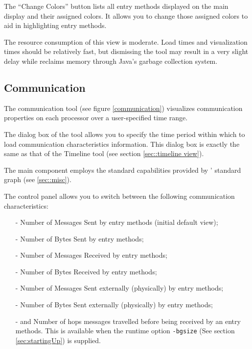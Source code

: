 \documentclass[10pt]{report}
\begin{document}
\begin{itemize}
The ``Change Colors'' button lists all entry methods displayed on the
main display and their assigned colors. It allows you to change those
assigned colors to aid in highlighting entry methods.

The resource consumption of this view is moderate. Load times and
visualization times should be relatively fast, but dismissing the tool
may result in a very slight delay while \projections{} reclaims memory
through Java's garbage collection system.

\end{itemize}

\subsection{Communication}
\label{sec::communication}

The communication tool (see figure \ref{communication}) visualizes
communication properties on each processor over a user-specified time
range.

The dialog box of the tool allows you to specify the time period
within which to load communication characteristics information. This
dialog box is exactly the same as that of the Timeline tool (see
section \ref{sec::timeline view}).

The main component employs the standard capabilities provided by
\projections{}' standard graph (see \ref{sec::misc}).

The control panel allows you to switch between the following
communication characteristics:

\begin{itemize}
\item[-] Number of Messages Sent by entry methods (initial default view);
\item[-] Number of Bytes Sent by entry methods;
\item[-] Number of Messages Received by entry methods;
\item[-] Number of Bytes Received by entry methods;
\item[-] Number of Messages Sent externally (physically) by entry methods;
\item[-] Number of Bytes Sent externally (physically) by entry methods;
\item[-] and Number of hops messages travelled before being received
by an entry methods. This is available when the runtime option {\tt -bgsize}
(See section \ref{sec:startingUp}) is supplied.
\end{itemize}
\end{document}
